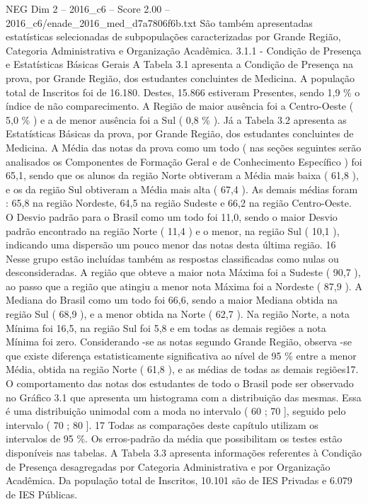 \begin{textsample}{NEG Dim 2 – 2016\_c6 – Score 2.00 – 2016\_c6/enade\_2016\_med\_d7a7806f6b.txt}
São também apresentadas estatísticas selecionadas de subpopulações caracterizadas por Grande Região, Categoria Administrativa e Organização Acadêmica. 3.1.1 - Condição de Presença e Estatísticas Básicas Gerais A Tabela 3.1 apresenta a Condição de Presença na prova, por Grande Região, dos estudantes concluintes de Medicina.
A população total de Inscritos foi de 16.180.
Destes, 15.866 estiveram Presentes, sendo 1,9 \% o índice de não comparecimento.
A Região de maior ausência foi a Centro-Oeste ( 5,0 \% ) e a de menor ausência foi a Sul ( 0,8 \% ).
Já a Tabela 3.2 apresenta as Estatísticas Básicas da prova, por Grande Região, dos estudantes concluintes de Medicina.
A Média das notas da prova como um todo ( nas seções seguintes serão analisados os Componentes de Formação Geral e de Conhecimento Específico ) foi 65,1, sendo que os alunos da região Norte obtiveram a Média mais baixa ( 61,8 ), e os da região Sul obtiveram a Média mais alta ( 67,4 ).
As demais médias foram : 65,8 na região Nordeste, 64,5 na região Sudeste e 66,2 na região Centro-Oeste.
O Desvio padrão para o Brasil como um todo foi 11,0, sendo o maior Desvio padrão encontrado na região Norte ( 11,4 ) e o menor, na região Sul ( 10,1 ), indicando uma dispersão um pouco menor das notas desta última região. 16 Nesse grupo estão incluídas também as respostas classificadas como nulas ou desconsideradas.
A região que obteve a maior nota Máxima foi a Sudeste ( 90,7 ), ao passo que a região que atingiu a menor nota Máxima foi a Nordeste ( 87,9 ).
A Mediana do Brasil como um todo foi 66,6, sendo a maior Mediana obtida na região Sul ( 68,9 ), e a menor obtida na Norte ( 62,7 ).
Na região Norte, a nota Mínima foi 16,5, na região Sul foi 5,8 e em todas as demais regiões a nota Mínima foi zero.
Considerando -se as notas segundo Grande Região, observa -se que existe diferença estatisticamente significativa ao nível de 95 \% entre a menor Média, obtida na região Norte ( 61,8 ), e as médias de todas as demais regiões17.
O comportamento das notas dos estudantes de todo o Brasil pode ser observado no Gráfico 3.1 que apresenta um histograma com a distribuição das mesmas.
Essa é uma distribuição unimodal com a moda no intervalo ( 60 ; 70 ], seguido pelo intervalo ( 70 ; 80 ]. 17 Todas as comparações deste capítulo utilizam os intervalos de 95 \%.
Os erros-padrão da média que possibilitam os testes estão disponíveis nas tabelas.
A Tabela 3.3 apresenta informações referentes à Condição de Presença desagregadas por Categoria Administrativa e por Organização Acadêmica.
Da população total de Inscritos, 10.101 são de IES Privadas e 6.079 de IES Públicas.

\end{textsample}
